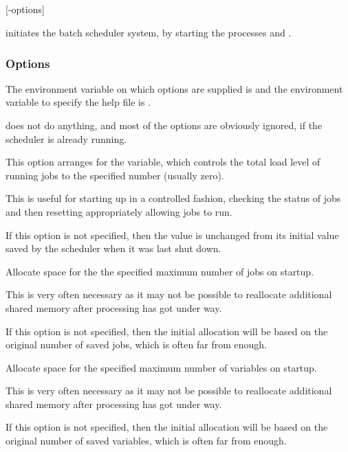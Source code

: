 \subsection{\BtstartName}

\begin{expara}

\BtstartName{} [-options]

\end{expara}

\PrBtstart{} initiates the \ProductName{} batch scheduler system, by starting the processes  and
.

\subsubsection[Options]{Options}
The environment variable on which options are supplied is \filename{\BtstartVarname} and the environment variable to specify the
help file is .

\PrBtstart{} does not do anything, and most of the options are obviously ignored, if the scheduler is already running.

\explainopt


This option arranges for the  variable, which controls the total load level of running jobs to the
specified number (usually zero).

This is useful for starting up in a controlled fashion, checking the status of jobs and then resetting  appropriately allowing jobs to run.

If this option is not specified, then the value is unchanged from its initial value saved by the scheduler when it was last shut down.


Allocate space for the the specified maximum number of jobs on startup.

This is very often necessary as it may not be possible to reallocate additional shared memory after processing has got under way.

If this option is not specified, then the initial allocation will be based on the original number of saved jobs, which is often far from enough.


Allocate space for the specified maximum number of variables on startup.

This is very often necessary as it may not be possible to reallocate additional shared memory after processing has got under way.

If this option is not specified, then the initial allocation will be based on the original number of saved variables, which is often far from enough.


